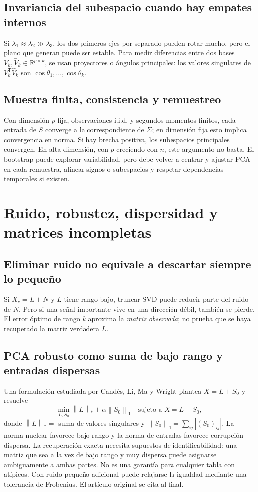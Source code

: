 \documentclass[11pt,a4paper]{article}
\newcommand{\R}{\mathbb R}
\newcommand{\T}{^{\mathsf T}}
\newcommand{\norm}[1]{\left\lVert #1\right\rVert}
\theoremstyle{definition}
\begin{document}
\subsection{Invariancia del subespacio cuando hay empates internos}
Si $\lambda_1\approx\lambda_2\gg\lambda_3$, los dos primeros ejes por separado pueden rotar mucho, pero el plano que generan puede ser estable. Para medir diferencias entre dos bases $V_k,\widehat V_k\in\R^{p\times k}$, se usan proyectores o ángulos principales: los valores singulares de $V_k\T\widehat V_k$ son $\cos\theta_1,\ldots,\cos\theta_k$.
\subsection{Muestra finita, consistencia y remuestreo}
Con dimensión $p$ fija, observaciones i.i.d. y segundos momentos finitos, cada entrada de $S$ converge a la correspondiente de $\Sigma$; en dimensión fija esto implica convergencia en norma. Si hay brecha positiva, los subespacios principales convergen. En alta dimensión, con $p$ creciendo con $n$, este argumento no basta. El bootstrap puede explorar variabilidad, pero debe volver a centrar y ajustar PCA en cada remuestra, alinear signos o subespacios y respetar dependencias temporales si existen.

\section{Ruido, robustez, dispersidad y matrices incompletas}
\subsection{Eliminar ruido no equivale a descartar siempre lo pequeño}
Si $X_c=L+N$ y $L$ tiene rango bajo, truncar SVD puede reducir parte del ruido de $N$. Pero si una señal importante vive en una dirección débil, también se pierde. El error óptimo de rango $k$ aproxima la \emph{matriz observada}; no prueba que se haya recuperado la matriz verdadera $L$.
\subsection{PCA robusto como suma de bajo rango y entradas dispersas}
Una formulación estudiada por Candès, Li, Ma y Wright plantea $X=L+S_0$ y resuelve
\[
\min_{L,S_0}\norm L_*+\alpha\norm{S_0}_1\quad\text{sujeto a }X=L+S_0,
\]
donde $\norm L_*=$ suma de valores singulares y $\norm{S_0}_1=\sum_{ij}|(S_0)_{ij}|$. La norma nuclear favorece bajo rango y la norma de entradas favorece corrupción dispersa. La recuperación exacta necesita supuestos de identificabilidad: una matriz que sea a la vez de bajo rango y muy dispersa puede asignarse ambiguamente a ambas partes. No es una garantía para cualquier tabla con atípicos. Con ruido pequeño adicional puede relajarse la igualdad mediante una tolerancia de Frobenius. El artículo original se cita al final.
\end{document}
